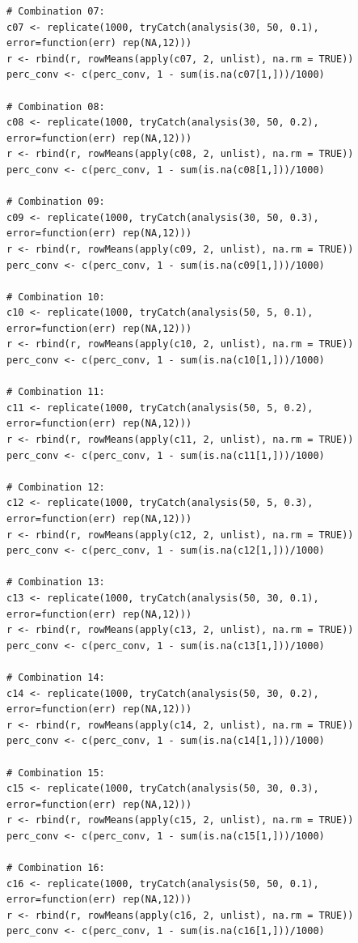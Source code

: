\documentclass[12pt,oneside,a4paper]{reedthesis}
\begin{document}
\begin{verbatim}
# Combination 07:
c07 <- replicate(1000, tryCatch(analysis(30, 50, 0.1), error=function(err) rep(NA,12)))
r <- rbind(r, rowMeans(apply(c07, 2, unlist), na.rm = TRUE))
perc_conv <- c(perc_conv, 1 - sum(is.na(c07[1,]))/1000)

# Combination 08:
c08 <- replicate(1000, tryCatch(analysis(30, 50, 0.2), error=function(err) rep(NA,12)))
r <- rbind(r, rowMeans(apply(c08, 2, unlist), na.rm = TRUE))
perc_conv <- c(perc_conv, 1 - sum(is.na(c08[1,]))/1000)

# Combination 09:
c09 <- replicate(1000, tryCatch(analysis(30, 50, 0.3), error=function(err) rep(NA,12)))
r <- rbind(r, rowMeans(apply(c09, 2, unlist), na.rm = TRUE))
perc_conv <- c(perc_conv, 1 - sum(is.na(c09[1,]))/1000)

# Combination 10:
c10 <- replicate(1000, tryCatch(analysis(50, 5, 0.1), error=function(err) rep(NA,12)))
r <- rbind(r, rowMeans(apply(c10, 2, unlist), na.rm = TRUE))
perc_conv <- c(perc_conv, 1 - sum(is.na(c10[1,]))/1000)

# Combination 11:
c11 <- replicate(1000, tryCatch(analysis(50, 5, 0.2), error=function(err) rep(NA,12)))
r <- rbind(r, rowMeans(apply(c11, 2, unlist), na.rm = TRUE))
perc_conv <- c(perc_conv, 1 - sum(is.na(c11[1,]))/1000)

# Combination 12:
c12 <- replicate(1000, tryCatch(analysis(50, 5, 0.3), error=function(err) rep(NA,12)))
r <- rbind(r, rowMeans(apply(c12, 2, unlist), na.rm = TRUE))
perc_conv <- c(perc_conv, 1 - sum(is.na(c12[1,]))/1000)

# Combination 13:
c13 <- replicate(1000, tryCatch(analysis(50, 30, 0.1), error=function(err) rep(NA,12)))
r <- rbind(r, rowMeans(apply(c13, 2, unlist), na.rm = TRUE))
perc_conv <- c(perc_conv, 1 - sum(is.na(c13[1,]))/1000)

# Combination 14:
c14 <- replicate(1000, tryCatch(analysis(50, 30, 0.2), error=function(err) rep(NA,12)))
r <- rbind(r, rowMeans(apply(c14, 2, unlist), na.rm = TRUE))
perc_conv <- c(perc_conv, 1 - sum(is.na(c14[1,]))/1000)

# Combination 15:
c15 <- replicate(1000, tryCatch(analysis(50, 30, 0.3), error=function(err) rep(NA,12)))
r <- rbind(r, rowMeans(apply(c15, 2, unlist), na.rm = TRUE))
perc_conv <- c(perc_conv, 1 - sum(is.na(c15[1,]))/1000)

# Combination 16:
c16 <- replicate(1000, tryCatch(analysis(50, 50, 0.1), error=function(err) rep(NA,12)))
r <- rbind(r, rowMeans(apply(c16, 2, unlist), na.rm = TRUE))
perc_conv <- c(perc_conv, 1 - sum(is.na(c16[1,]))/1000)


\end{verbatim}
\end{document}
